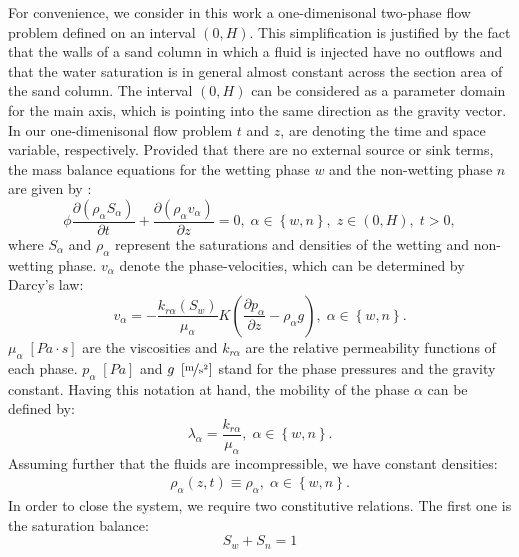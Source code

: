 \documentclass[smallextended]{svjour3}       %
\begin{document}
For convenience, we consider in this work a one-dimenisonal two-phase flow problem defined on an interval $\left(0,H\right)$. This simplification is justified by the fact 
that the walls of a sand column in which a fluid is injected have no outflows and that the water saturation is in general almost constant across the
section area of the sand column. The interval $\left(0,H\right)$ can be considered as a parameter domain for the main axis, which is pointing into the same direction as the
gravity vector. In our one-dimenisonal flow problem $t$ and $z$, are denoting the time and space variable, respectively. Provided that there are no external source or sink terms,
the mass balance equations for the wetting phase $w$ and the non-wetting phase $n$ are given by \cite{helmig1997multiphase}:
\begin{equation}
\label{eq:massbalance}
\phi \frac{\partial\left(\rho_\alpha S_\alpha \right)}{\partial t} + \frac{ \partial \left(\rho_\alpha v_\alpha \right)}{\partial z} = 0,\; \alpha \in \left\{w,n \right\},\; z \in \left(0,H \right),\;t>0,
\end{equation}
where $S_\alpha$ and $\rho_\alpha$ represent the saturations and densities of the wetting and non-wetting phase. $v_\alpha$ denote the phase-velocities, which can be determined by 
Darcy's law:
\begin{equation}
\label{eq:Darcy}
v_\alpha = -\frac{k_{r\alpha} \left(S_w \right)}{\mu_\alpha}K \left( \frac{\partial p_\alpha}{\partial z} 
- \rho_\alpha g \right),\; \alpha \in \left\{w,n\right\}.
\end{equation}
$\mu_\alpha\;\left[Pa\cdot s\right]$ are the viscosities and $k_{r\alpha}$ are the relative permeability functions of each phase. $p_\alpha\; \left[\unit{Pa} \right]$ and 
$g\;\left[\unitfrac{m}{s^2} \right]$ stand for the phase pressures and the gravity constant. Having this notation at hand, the mobility of the phase $\alpha$ can be defined
by:
\begin{equation}
\label{eq:mobility}
\lambda_\alpha = \frac{k_{r\alpha}}{\mu_\alpha},\; \alpha \in \left\{w,n\right\}.
\end{equation}
Assuming further that the fluids are incompressible, we have constant densities:
\begin{align}
\label{eq:inkompr}
\rho_\alpha(z,t) \equiv \rho_\alpha,\; \alpha \in \left\{w,n\right\}.
\end{align}
In order to close the system, we require two constitutive relations. The first one is the saturation balance:
\begin{equation}
\label{eq:satBal}
S_w + S_n = 1
\end{equation}
\end{document}
